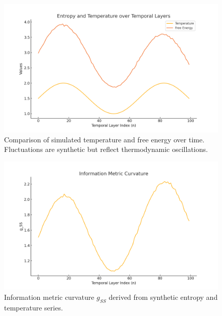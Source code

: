 \begin{figure}[h!]
\centering
\includegraphics[width=0.9\linewidth]{05_Simulations/temp_free_energy.png}
\caption{Comparison of simulated temperature and free energy over time. Fluctuations are synthetic but reflect thermodynamic oscillations.}
\end{figure}

\begin{figure}[h!]
\centering
\includegraphics[width=0.9\linewidth]{05_Simulations/info_metric_curvature.png}
\caption{Information metric curvature $g_{SS}$ derived from synthetic entropy and temperature series.}
\end{figure}
